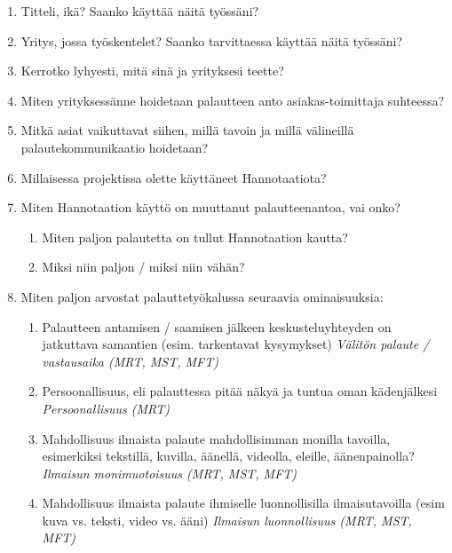 \documentclass[english,12pt,a4paper,pdftex]{article}
\begin{document}
\begin{enumerate}

\item Titteli, ikä? Saanko käyttää näitä työssäni?

\item Yritys, jossa työskentelet? Saanko tarvittaessa käyttää näitä työssäni?

\item Kerrotko lyhyesti, mitä sinä ja yrityksesi teette?

\item Miten yrityksessänne hoidetaan palautteen anto asiakas-toimittaja suhteessa?

\item Mitkä asiat vaikuttavat siihen, millä tavoin ja millä välineillä palautekommunikaatio hoidetaan?

\item Millaisessa projektissa olette käyttäneet Hannotaatiota?

\item Miten Hannotaation käyttö on muuttanut palautteenantoa, vai onko?
  \begin{enumerate}
    \item Miten paljon palautetta on tullut Hannotaation kautta?
    \item Miksi niin paljon / miksi niin vähän?
  \end{enumerate}


\item Miten paljon arvostat palauttetyökalussa seuraavia ominaisuuksia:
  \begin{enumerate}
    \item Palautteen antamisen / saamisen jälkeen keskusteluyhteyden on jatkuttava samantien (esim. tarkentavat kysymykset) \textit{Välitön palaute / vastausaika (MRT, MST, MFT)}
    
    \item Persoonallisuus, eli palauttessa pitää näkyä ja tuntua oman kädenjälkesi \textit{Persoonallisuus (MRT)}
    
    \item Mahdollisuus ilmaista palaute mahdollisimman monilla tavoilla, esimerkiksi tekstillä, kuvilla, äänellä, videolla, eleille, äänenpainolla? \textit{Ilmaisun monimuotoisuus (MRT, MST, MFT)}
    
    \item Mahdollisuus ilmaista palaute ihmiselle luonnollisilla ilmaisutavoilla (esim kuva vs. teksti, video vs. ääni) \textit{Ilmaisun luonnollisuus (MRT, MST, MFT)}
    

\end{enumerate}
\end{enumerate}
\end{document}
